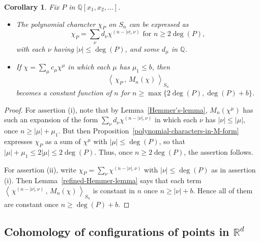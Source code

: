 \documentclass[12pt]{amsart}
\theoremstyle{plain}
\newtheorem{cor}[thm]{Corollary}
\theoremstyle{definition}
\begin{document}
\begin{cor}
\label{refined-polynomial-character-bound}
Fix $P$ in ${{\mathbb Q}}[x_1,x_2,\ldots]$.
\begin{itemize}
\item[(i)] The polynomial character $\chi_P$ on $S_n$ 
can be expressed as
$$
\chi_P = \sum_{\nu} d_\nu \chi^{(n-|\nu|,\nu)} \text{ for }n \geq 2\deg(P),
$$
with each $\nu$ having $|\nu| \leq \deg(P)$, and some $d_\mu$ in ${{\mathbb Q}}$.
\item[(ii)] If $\chi=\sum_\mu c_\mu \chi^\mu$ in which each $\mu$ has
$\mu_1 \leq b$, then 
$$
\left\langle 
\, 
\chi_P \, , \, 
M_n(\chi) 
\,
\right\rangle_{S_n}
$$
becomes a constant function of $n$ for $n \geq \max\{ 2 \deg(P), \deg(P)+b \}$.
\end{itemize}
\end{cor}

\begin{proof}
For assertion (i), note that by Lemma~\ref{Hemmer's-lemma}, 
$M_n(\chi^\mu)$ has such an expansion of the form
$\sum_{\nu} d_\nu \chi^{(n-|\nu|,\nu)}$ 
in which each $\nu$ has $|\nu| \leq |\mu|$,
once $n \geq |\mu|+\mu_1$.  But then
Proposition~\ref{polynomial-characters-in-M-form} expresses
$\chi_P$ as a sum of $\chi^\mu$ with $|\mu| \leq \deg(P)$,
so that $|\mu| + \mu_1 \leq 2|\mu| \leq 2\deg(P)$.  Thus, 
once $n \geq 2\deg(P)$, the assertion follows.

For assertion (ii), write $\chi_P=\sum_\nu \chi^{(n-|\nu|,\nu)}$ 
with $|\nu| \leq \deg(P)$ as in assertion (i).  
Then Lemma~\ref{refined-Hemmer-lemma} says that each term
$
\left\langle 
\, 
\chi^{(n-|\nu|,\nu)} 
\, , \, 
M_n(\chi) 
\,
\right\rangle_{S_n}
$
is constant in $n$ once $n \geq |\nu|+b$.  Hence
all of them are constant once $n \geq \deg(P)+b$.
\end{proof}

\subsection{Cohomology of configurations of points in ${{\mathbb{R}}}^d$}
\label{cohomology-section}
\end{document}
